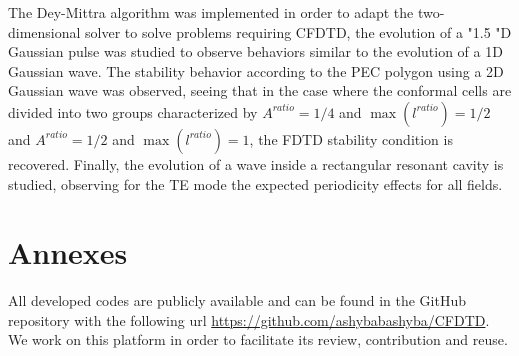 \documentclass[12pt, oneside]{book}
\begin{document}
The Dey-Mittra algorithm was implemented in order to adapt the two-dimensional solver to solve problems requiring CFDTD, the evolution of a "1.5 "D Gaussian pulse was studied to observe behaviors similar to the evolution of a 1D Gaussian wave. The stability behavior according to the PEC polygon using a 2D Gaussian wave was observed, seeing that in the case where the conformal cells are divided into two groups characterized by $A^{ratio} = 1/4$ and $\max({l^{ratio}}) = 1/2$ and $A^{ratio} = 1/2$ and $\max({l^{ratio}}) = 1$, the FDTD stability condition is recovered. Finally, the evolution of a wave inside a rectangular resonant cavity is studied, observing for the TE mode the expected periodicity effects for all fields. 

\chapter{Annexes}

All developed codes are publicly available and can be found in the GitHub repository with the following url \url{https://github.com/ashybabashyba/CFDTD}. We work on this platform in order to facilitate its review, contribution and reuse.







\end{document}

